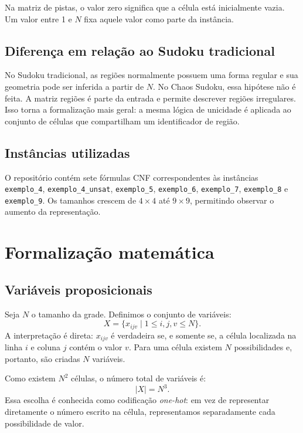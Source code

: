 \documentclass[a4paper, 12pt]{article}
\begin{document}
Na matriz de pistas, o valor zero significa que a célula está inicialmente vazia. Um valor entre 1 e \(N\) fixa aquele valor como parte da instância.

\subsection{Diferença em relação ao Sudoku tradicional}

No Sudoku tradicional, as regiões normalmente possuem uma forma regular e sua geometria pode ser inferida a partir de \(N\). No Chaos Sudoku, essa hipótese não é feita. A matriz regiões é parte da entrada e permite descrever regiões irregulares. Isso torna a formalização mais geral: a mesma lógica de unicidade é aplicada ao conjunto de células que compartilham um identificador de região.

\subsection{Instâncias utilizadas}

O repositório contém sete fórmulas CNF correspondentes às instâncias \texttt{exemplo\_4}, \texttt{exemplo\_4\_unsat}, \texttt{exemplo\_5}, \texttt{exemplo\_6}, \texttt{exemplo\_7}, \texttt{exemplo\_8} e \texttt{exemplo\_9}. Os tamanhos crescem de \(4\times4\) até \(9\times9\), permitindo observar o aumento da representação.

\section{Formalização matemática}

\subsection{Variáveis proposicionais}

Seja \(N\) o tamanho da grade. Definimos o conjunto de variáveis:
\[
X = \{ x_{ijv} \mid 1 \leq i, j, v \leq N \}.
\]
A interpretação é direta: \(x_{ijv}\) é verdadeira se, e somente se, a célula localizada na linha \(i\) e coluna \(j\) contém o valor \(v\). Para uma célula existem \(N\) possibilidades e, portanto, são criadas \(N\) variáveis.

Como existem \(N^2\) células, o número total de variáveis é:
\[
|X| = N^3.
\]
Essa escolha é conhecida como codificação \emph{one-hot}: em vez de representar diretamente o número escrito na célula, representamos separadamente cada possibilidade de valor.
\end{document}
